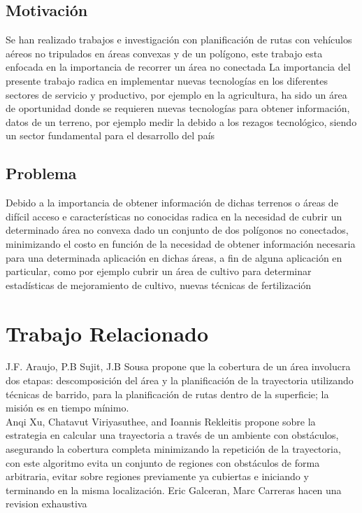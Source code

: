 \documentclass[]{report}
\begin{document}
\section{Motivación}
Se han realizado trabajos e investigación con planificación de rutas con vehículos aéreos no tripulados en áreas convexas y de un polígono, este trabajo esta enfocada en la importancia de recorrer un área no conectada
La importancia del presente trabajo radica en implementar nuevas tecnologías en los diferentes sectores de servicio y productivo, por ejemplo en la agricultura, ha sido un área de oportunidad donde se requieren nuevas tecnologías para obtener información, datos de un terreno, por ejemplo medir la   debido a los rezagos tecnológico, siendo un sector fundamental para el desarrollo del país

\section{Problema}

Debido a la importancia de  obtener información de dichas terrenos o áreas de difícil acceso e características no conocidas  radica en la necesidad de cubrir un determinado área no convexa dado un conjunto de dos polígonos no conectados, minimizando el costo en función de la necesidad de obtener información necesaria para una determinada aplicación en dichas áreas, a fin de alguna aplicación en particular, como por ejemplo cubrir un área de cultivo para determinar estadísticas de mejoramiento de cultivo, nuevas técnicas de fertilización

\chapter{Trabajo Relacionado}

J.F. Araujo, P.B Sujit, J.B Sousa propone que la cobertura de un área involucra dos etapas: descomposición del área y la planificación de la trayectoria utilizando técnicas de barrido, para la planificación de rutas dentro de la superficie; la misión es en tiempo mínimo.\cite{1}\\
Anqi Xu, Chatavut Viriyasuthee, and Ioannis Rekleitis propone sobre  la estrategia en calcular una trayectoria a través de un ambiente con obstáculos, asegurando la cobertura completa minimizando la repetición de la trayectoria, con este algoritmo evita un conjunto de regiones con obstáculos de forma arbitraria, evitar sobre regiones previamente ya cubiertas e iniciando y terminando en la misma localización. \cite{2}
Eric Galceran, Marc Carreras hacen una revision exhaustiva 
\end{document}
